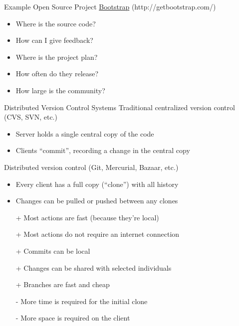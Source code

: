 \documentclass{beamer}
\begin{document}
\begin{frame}{Example Open Source Project}
\href{http://getbootstrap.com/}{Bootstrap} (http://getbootstrap.com/)
\begin{itemize}
\item Where is the source code?
\item How can I give feedback?
\item Where is the project plan?
\item How often do they release?
\item How large is the community?
\end{itemize}
\end{frame}

\begin{frame}{Distributed Version Control Systems}
Traditional centralized version control (CVS, SVN, etc.)
\begin{itemize}
\item Server holds a single central copy of the code
\item Clients ``commit'', recording a change in the central copy
\end{itemize}
\medskip
Distributed version control (Git, Mercurial, Bazaar, etc.)
\begin{itemize}
\item Every client has a full copy (``clone'') with all history
\item Changes can be pulled or pushed between any clones
\pause
\item[+] Most actions are fast (because they're local)
\item[+] Most actions do not require an internet connection
\item[+] Commits can be local
\item[+] Changes can be shared with selected individuals
\item[+] Branches are fast and cheap
\item[-] More time is required for the initial clone
\item[-] More space is required on the client
\end{itemize}
\end{frame}
\end{document}
